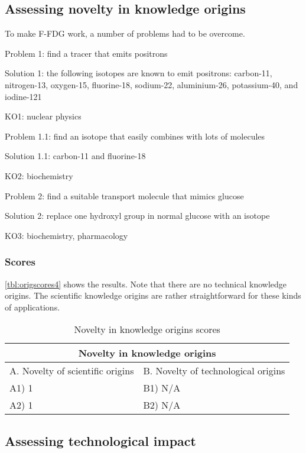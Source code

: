 \subsection{Assessing novelty in knowledge origins}
To make F-FDG work, a number of problems had to be overcome.

Problem 1: find a tracer that emits positrons

Solution 1: the following isotopes are known to emit positrons:  carbon-11,
nitrogen-13, oxygen-15, fluorine-18, sodium-22, aluminium-26, potassium-40, 
and iodine-121

KO1: nuclear physics

Problem 1.1: find an isotope that easily combines with lots of molecules 

Solution 1.1: carbon-11 and fluorine-18 \cite{radiopharma}

KO2: biochemistry

Problem 2: find a suitable transport molecule that mimics glucose

Solution 2: replace one hydroxyl group in normal glucose with an isotope 

KO3: biochemistry, pharmacology

\subsubsection{Scores}
\autoref{tbl:origscores4} shows the results. Note that there are no technical
knowledge origins. The scientific knowledge origins are rather straightforward
for these kinds of applications.

\begin{table}[h]
\centering
\begin{tabular}{l l}
\hline
\multicolumn{2}{|c|}{Novelty in knowledge origins} \\
\hline
A. Novelty of scientific origins & B. Novelty of technological origins\\
A1) 1 & B1) N/A\\ 
A2) 1 & B2) N/A\\ 
\hline
\end{tabular}
\caption{Novelty in knowledge origins scores}
\label{tbl:origscores4}
\end{table}

\subsection{Assessing technological impact}

